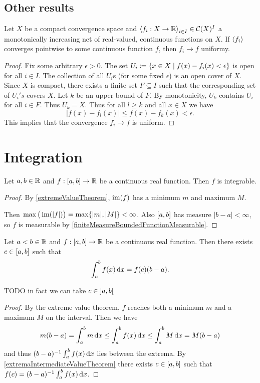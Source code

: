 \subsection{Other results}
\begin{proposition}
Let $X$ be a compact convergence space and $\left\langle f_i:X\to \mathbb{R} \right\rangle_{i\in I}\in \operatorname{\mathcal{C}}(X)^I$ a monotonically increasing net of real-valued, continuous functions on $X$. If $\left\langle f_i \right\rangle$ converges pointwise to some continuous function $f$, then $f_i \to f$ uniformy.
\end{proposition}
\begin{proof}
Fix some arbitrary $\epsilon > 0$. The set $U_i \defeq \setbuilder{x\in X}{f(x)-f_i(x) < \epsilon}$ is open for all $i\in I$. The collection of all $U_i$s (for some fixed $\epsilon$) is an open cover of $X$. Since $X$ is compact, there exists a finite set $F\subseteq I$ such that the corresponding set of $U_i's$ covers $X$. Let $k$ be an upper bound of $F$. By monotonicity, $U_k$ contains $U_i$ for all $i\in F$. Thus $U_k = X$. Thus for all $l \geq k$ and all $x\in X$ we have
\[ |f(x) - f_l(x)| \leq f(x) - f_k(x) < \epsilon. \]
This implies that the convergence $f_i\to f$ is uniform.
\end{proof}



\section{Integration}
\begin{lemma} \label{continuousRealFunctionIntegrable}
Let $a,b\in \mathbb{R}$ and $f:\interval{a,b}\to \R$ be a continuous real function. Then $f$ is integrable.
\end{lemma}
\begin{proof}
By \ref{extremeValueTheorem}, $\operatorname{im}(f)$ has a minimum $m$ and maximum $M$.

Then $\max\big(\operatorname{im}(|f|)\big) = \max\{|m|, |M|\}<\infty$. Also $\interval{a,b}$ has measure $|b-a|<\infty$, so $f$ is measurable by \ref{finiteMeasureBoundedFunctionMeasurable}.
\end{proof}

\begin{proposition} \label{meanValueTheoremIntegrals}
Let $a<b\in \mathbb{R}$ and $f:\interval{a,b}\to \R$ be a continuous real function. Then there exists $c\in \interval{a,b}$ such that
\[ \int_a^bf(x)\operatorname{d \!}{x} = f(c)(b-a). \]
\end{proposition}
TODO in fact we can take $c\in \interval[o]{a,b}$
\begin{proof}
By the extreme value theorem, $f$ reaches both a minimum $m$ and a maximum $M$ on the interval. Then we have
\[ m(b-a) = \int_a^bm\operatorname{d \!}{x} \leq \int_a^bf(x)\operatorname{d \!}{x} \leq \int_a^bM\operatorname{d \!}{x} = M(b-a) \]
and thus $(b-a)^{-1}\int_a^bf(x)\operatorname{d \!}{x}$ lies between the extrema. By \ref{extremaIntermediateValueTheorem} there exists $c\in \interval{a,b}$ such that $f(c) = (b-a)^{-1}\int_a^bf(x)\operatorname{d \!}{x}$.
\end{proof}


